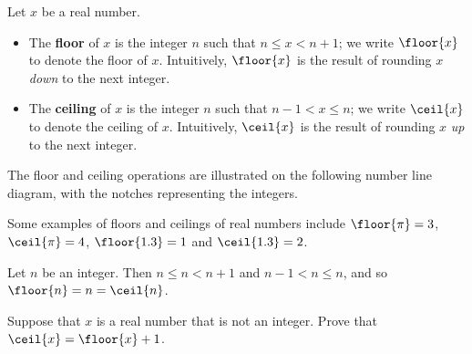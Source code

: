 \begin{definition}
Let $x$ be a real number.
\begin{itemize}
\item The \textbf{floor} of $x$ is the integer $n$ such that $n \le x < n+1$; we write $\floor{x}$ to denote the floor of $x$. Intuitively, $\floor{x}$ is the result of rounding $x$ \textit{down} to the next integer.
\item The \textbf{ceiling} of $x$ is the integer $n$ such that $n-1 < x \le n$; we write $\ceil{x}$ to denote the ceiling of $x$. Intuitively, $\ceil{x}$ is the result of rounding $x$ \textit{up} to the next integer.
\end{itemize}

The floor and ceiling operations are illustrated on the following number line diagram, with the notches representing the integers.
\begin{center}
\end{center}
\end{definition}

\begin{example}
Some examples of floors and ceilings of real numbers include $\floor{\pi} = 3$, $\ceil{\pi} = 4$, $\floor{1.3} = 1$ and $\ceil{1.3} = 2$.
\end{example}

\begin{example}
Let $n$ be an integer. Then $n \le n < n+1$ and $n-1 < n \le n$, and so $\floor{n} = n = \ceil{n}$.
\end{example}

\begin{exercise}
\label{exFloorCeilingOfNonInteger}
Suppose that $x$ is a real number that is not an integer. Prove that $\ceil{x} = \floor{x} + 1$.
%
%
\end{exercise}

